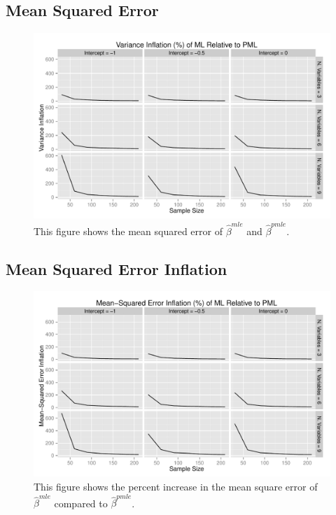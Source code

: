 \documentclass[12pt]{article}
\begin{document}
\begin{appendix}
\subsection{Mean Squared Error}

\begin{figure}[H]
\begin{center}
\includegraphics[width = \textwidth]{figs/sims-var-infl.pdf}
\caption{This figure shows the mean squared error of $\hat{\beta}^{mle}$ and $\hat{\beta}^{pmle}$.}\label{fig:mse}
\end{center}
\end{figure}

\subsection{Mean Squared Error Inflation}

\begin{figure}[H]
\begin{center}
\includegraphics[width = \textwidth]{figs/sims-mse-infl.pdf}
\caption{This figure shows the percent increase in the mean square error of $\hat{\beta}^{mle}$ compared to $\hat{\beta}^{pmle}$.}\label{fig:mse-infl}
\end{center}
\end{figure}

\end{appendix}
\end{document}
